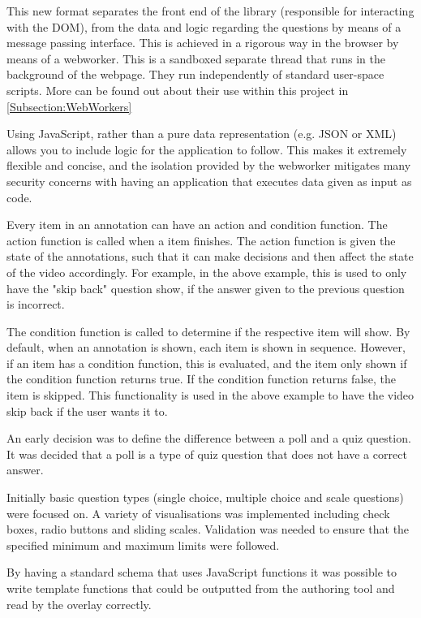 This new format separates the front end of the library (responsible for
interacting with the \gls{DOM}), from the data and logic regarding the questions by
means of a message passing interface. This is achieved in a rigorous way in the
browser by means of a \gls{webworker}. This is a sandboxed separate thread that runs
in the background of the webpage. They run independently of standard user-space
scripts.  More can be found out about their use within this project in \autoref{Subsection:WebWorkers}

Using JavaScript, rather than a pure data representation (e.g. JSON or XML)
allows you to include logic for the application to follow. This makes it extremely
flexible and concise, and the isolation provided by the \gls{webworker} mitigates
many security concerns with having an application that executes data given as
input as code.

Every item in an annotation can have an action and condition function. The
action function is called when a item finishes. The action function is given
the state of the annotations, such that it can make decisions and then affect
the state of the video accordingly. For example, in the above example, this is
used to only have the "skip back" question show, if the answer given to the
previous question is incorrect.

The condition function is called to determine if the respective item will show.
By default, when an annotation is shown, each item is shown in sequence.
However, if an item has a condition function, this is evaluated, and the item
only shown if the condition function returns true. If the condition function
returns false, the item is skipped. This functionality is used in the above
example to have the video skip back if the user wants it to.


An early decision was to define the difference between a poll and a quiz
question. It was decided that a poll is a type of quiz question that does not
have a correct answer.

Initially basic question types (single choice, multiple choice and scale
questions) were focused on. A variety of visualisations was implemented
including check boxes, radio buttons and sliding scales. Validation was needed
to ensure that the specified minimum and maximum limits were followed.

By having a standard schema that uses JavaScript functions it was possible to
write template functions that could be outputted from the authoring tool and
read by the overlay correctly.

